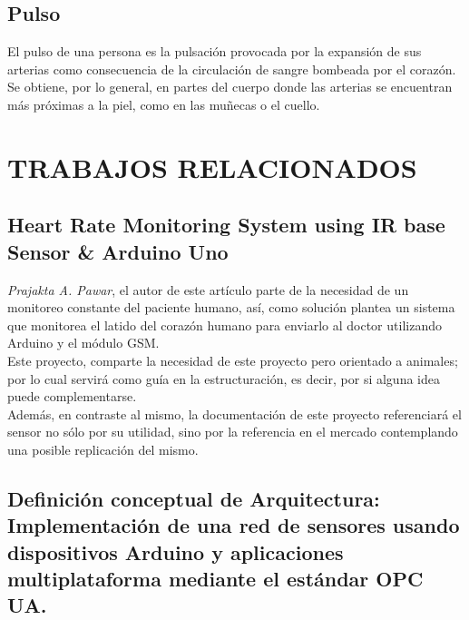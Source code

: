 \documentclass[letterpaper, 10 pt, conference]{ieeeconf}  %
\begin{document}
\subsection{Pulso}

El pulso de una persona es la pulsaci\'on provocada por la expansi\'on de sus arterias como consecuencia de la circulaci\'on de sangre bombeada por el coraz\'on. Se obtiene, por lo general, en partes del cuerpo donde las arterias se encuentran m\'as pr\'oximas a la piel, como en las muñecas o el cuello.

\section{TRABAJOS RELACIONADOS}

\subsection{Heart Rate Monitoring System using IR base Sensor \& Arduino Uno  \cite{c7}}

\textit{Prajakta A. Pawar}, el autor de este art\'iculo parte de la necesidad de un monitoreo constante del paciente humano, as\'i, como soluci\'on plantea un sistema que monitorea el latido del coraz\'on humano para enviarlo al doctor utilizando Arduino y el m\'odulo GSM.\\

Este proyecto, comparte la necesidad de este proyecto pero orientado a animales; por lo cual servir\'a como gu\'ia en la estructuraci\'on, es decir, por si alguna idea puede complementarse.\\

Adem\'as, en contraste al mismo, la documentaci\'on de este proyecto referenciar\'a el sensor no s\'olo por su utilidad, sino por la referencia en el mercado contemplando una posible replicaci\'on del mismo.


\subsection{Definici\'on conceptual de Arquitectura: Implementaci\'on de una red de sensores usando dispositivos Arduino y aplicaciones multiplataforma mediante el est\'andar OPC UA. \cite{c1}}
\end{document}

